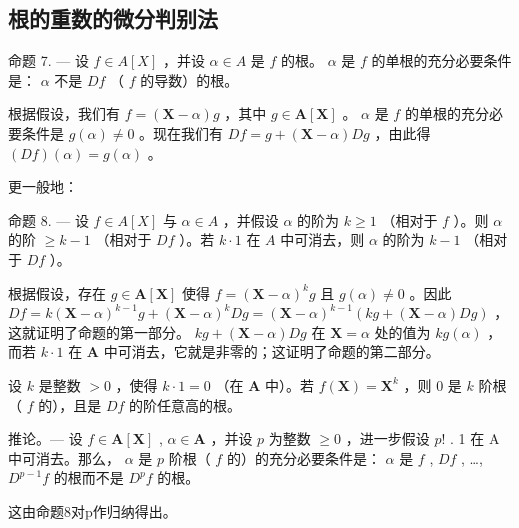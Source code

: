 \subsection{根的重数的微分判别法}

命题 7. --- 设 \(f \in A[X]\) ，并设 \(\alpha \in A\) 是 \(f\) 的根。 \(\alpha\) 是 \(f\) 的单根的充分必要条件是： \(\alpha\) 不是 \(Df\) （ \(f\) 的导数）的根。

根据假设，我们有 \(f = (\mathbf{X} - \alpha)g\) ，其中 \(g \in \mathbf{A}[\mathbf{X}]\) 。 \(\alpha\) 是 \(f\) 的单根的充分必要条件是 \(g(\alpha) \neq 0\) 。现在我们有 \(Df = g + (\mathbf{X} - \alpha)Dg\) ，由此得 \((Df)(\alpha) = g(\alpha)\) 。

更一般地：

命题 8. --- 设 \(f \in A[X]\) 与 \(\alpha \in A\) ，并假设 \(\alpha\) 的阶为 \(k \geqslant 1\) （相对于 \(f\) ）。则 \(\alpha\) 的阶 \(\geqslant k - 1\) （相对于 \(Df\) ）。若 \(k \cdot 1\) 在 \(A\) 中可消去，则 \(\alpha\) 的阶为 \(k - 1\) （相对于 \(Df\) ）。

根据假设，存在 \(g \in \mathbf{A}[\mathbf{X}]\) 使得 \(f = (\mathbf{X} - \alpha)^k g\) 且 \(g(\alpha) \neq 0\) 。因此 \(Df = k(\mathbf{X} - \alpha)^{k-1}g + (\mathbf{X} - \alpha)^k Dg = (\mathbf{X} - \alpha)^{k-1}(kg + (\mathbf{X} - \alpha)Dg)\) ，这就证明了命题的第一部分。 \(kg + (\mathbf{X} - \alpha)Dg\) 在 \(\mathbf{X} = \alpha\) 处的值为 \(kg(\alpha)\) ，而若 \(k \cdot 1\) 在 \(\mathbf{A}\) 中可消去，它就是非零的；这证明了命题的第二部分。

设 \(k\) 是整数 \(> 0\) ，使得 \(k \cdot 1 = 0\) （在 \(\mathbf{A}\) 中）。若 \(f(\mathbf{X}) = \mathbf{X}^k\) ，则 \(0\) 是 \(k\) 阶根（ \(f\) 的），且是 \(Df\) 的阶任意高的根。

推论。--- 设 \(f \in \mathbf{A}[\mathbf{X}]\) , \(\alpha \in \mathbf{A}\) ，并设 \(p\) 为整数 \(\geqslant 0\) ，进一步假设 \(p!\) . 1 在 A 中可消去。那么， \(\alpha\) 是 \(p\) 阶根（ \(f\) 的）的充分必要条件是： \(\alpha\) 是 \(f\) , \(Df\) , \ldots, \(D^{p-1}f\) 的根而不是 \(D^p f\) 的根。

这由命题8对p作归纳得出。

